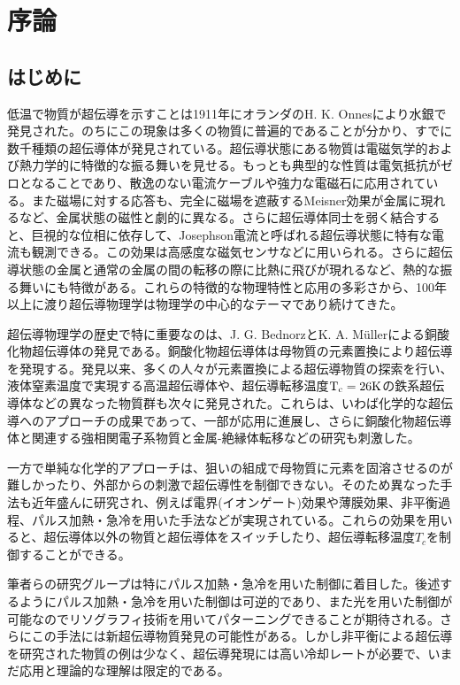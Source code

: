 \section{序論}
\subsection{はじめに}
低温で物質が超伝導を示すことは1911年にオランダのH. K. Onnesにより水銀で発見された。のちにこの現象は多くの物質に普遍的であることが分かり、すでに数千種類の超伝導体が発見されている。超伝導状態にある物質は電磁気学的および熱力学的に特徴的な振る舞いを見せる。もっとも典型的な性質は電気抵抗がゼロとなることであり、散逸のない電流ケーブルや強力な電磁石に応用されている。また磁場に対する応答も、完全に磁場を遮蔽するMeisner効果が金属に現れるなど、金属状態の磁性と劇的に異なる。さらに超伝導体同士を弱く結合すると、巨視的な位相に依存して、Josephson電流と呼ばれる超伝導状態に特有な電流も観測できる。この効果は高感度な磁気センサなどに用いられる。さらに超伝導状態の金属と通常の金属の間の転移の際に比熱に飛びが現れるなど、熱的な振る舞いにも特徴がある。これらの特徴的な物理特性と応用の多彩さから、100年以上に渡り超伝導物理学は物理学の中心的なテーマであり続けてきた。

超伝導物理学の歴史で特に重要なのは、J. G. BednorzとK. A. M\"ullerによる銅酸化物超伝導体の発見である\cite{Bednorz}。銅酸化物超伝導体は母物質の元素置換により超伝導を発現する\cite{Lee2006}。発見以来、多くの人々が元素置換による超伝導物質の探索を行い、液体窒素温度で実現する高温超伝導体\cite{Wu}や、超伝導転移温度$\rm T_c=26K$の鉄系超伝導体\cite{Kamihara}などの異なった物質群も次々に発見された。これらは、いわば化学的な超伝導へのアプローチの成果であって、一部が応用に進展し、さらに銅酸化物超伝導体と関連する強相関電子系物質と金属-絶縁体転移などの研究も刺激した\cite{Lee2006,Imada}。

一方で単純な化学的アプローチは、狙いの組成で母物質に元素を固溶させるのが難しかったり、外部からの刺激で超伝導性を制御できない。そのため異なった手法も近年盛んに研究され、例えば電界(イオンゲート)効果\cite{Ueno,Ueno2,Ye2009}や薄膜効果\cite{Chiang1900}、非平衡過程\cite{Fausti,Hunt2015,Mitrano2016}、パルス加熱・急冷\cite{oike}を用いた手法などが実現されている。これらの効果を用いると、超伝導体以外の物質と超伝導体をスイッチしたり、超伝導転移温度$T_c$を制御することができる。

筆者らの研究グループは特にパルス加熱・急冷を用いた制御に着目した。後述するようにパルス加熱・急冷を用いた制御は可逆的であり、また光を用いた制御が可能なのでリソグラフィ技術を用いてパターニングできることが期待される。さらにこの手法には新超伝導物質発見の可能性がある。しかし非平衡による超伝導を研究された物質の例は少なく、超伝導発現には高い冷却レートが必要で、いまだ応用と理論的な理解は限定的である。

